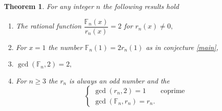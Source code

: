 \documentclass[pdflatex,sn-mathphys-num]{sn-jnl}%
\newtheorem{theorem}{Theorem}
\theoremstyle{thmstyleone}%
\theoremstyle{thmstyletwo}%
\theoremstyle{thmstylethree}%
\begin{document}
\begin{theorem}\label{cpr}
For any integer $n$ the following results hold
\begin{enumerate}
    \item The rational function $\dfrac{\mathbb{F}_{n}(x)}{r_n(x)}=2$ for $r_n(x)\neq 0,$
    \item For $x=1$ the number $\mathbb{F}_{n}(1)=2r_n(1)$ as in conjecture \ref{main},
     \item $\gcd(\mathbb{F}_{n},2)=2, $
    \item For $n\geq 3$ the $r_n$ is always an odd number and the
\begin{equation*}
\begin{cases}
	\text{$\gcd(r_{n},2)=1$}    & \text{coprime}\\
	\text{$\gcd(\mathbb{F}_{n}, r_{n})=r_{n}$}.
\end{cases}
 \end{equation*}
\end{enumerate} 
\end{theorem}
\end{document}
